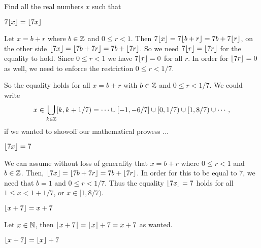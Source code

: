 \documentclass[a4paper, english, 12pt]{article} %
\begin{document}
\begin{problem}
  Find all the real numbers $x$ such that
\end{problem}

\begin{subproblem}
  $7 \lfloor x\rfloor = \lfloor7x\rfloor$
\end{subproblem}

\begin{answer}
  Let $x = b + r$ where $b\in \mathbb{Z}$ and $0 \leq r < 1$. Then $7 \lfloor x\rfloor = 7
  \lfloor b + r\rfloor = 7b + 7 \lfloor r\rfloor$, on the other side $\lfloor7x\rfloor = \lfloor7b +
    7r\rfloor = 7b + \lfloor7r\rfloor$. So we need $7\lfloor r\rfloor = \lfloor7r\rfloor$ for the
  equality to hold. Since $0 \leq r < 1$ we have $7\lfloor r\rfloor = 0$ for all $r$.
  In order for $\lfloor7r\rfloor = 0$ as well, we need to enforce the restriction $0
  \leq r < 1/7$.

  So the equality holds for all $x = b + r$ with $b \in \mathbb{Z}$ and $0 \leq r <
  1/7$. We could write
  \begin{equation}
    x \in \bigcup_{k \in \mathbb{Z}} [k,k+1/7)
    = \cdots \cup [-1,-6/7] \cup [0,1/7) \cup [1,8/7) \cup \cdots\,,
  \end{equation}
  if we wanted to showoff our mathematical prowess ...
\end{answer}

\begin{subproblem}
  $\lfloor7x\rfloor = 7$
\end{subproblem}

\begin{answer}
  We can assume without loss of generality that $x = b +r$ where $0 \leq r < 1$
  and $b \in \mathbb{Z}$. Then, $\lfloor7x\rfloor = \lfloor7b + 7r\rfloor = 7b + \lfloor7r\rfloor$. In
  order for this to be equal to $7$, we need that $b = 1$ and $0 \leq r < 1/7$.
  Thus the equality $\lfloor7x\rfloor = 7$ holds for all $1 \leq x < 1 + 1/7$, or $x
  \in [1,8/7)$.
\end{answer}

\begin{subproblem}
  $\lfloor x + 7\rfloor = x + 7$
\end{subproblem}

\begin{answer}
  Let $x \in \mathbb{N}$, then $\lfloor x + 7\rfloor = \lfloor x\rfloor + 7 = x + 7$ as wanted.
\end{answer}

\begin{subproblem}
  $\lfloor x + 7\rfloor = \lfloor x\rfloor + 7$
\end{subproblem}
\end{document}
